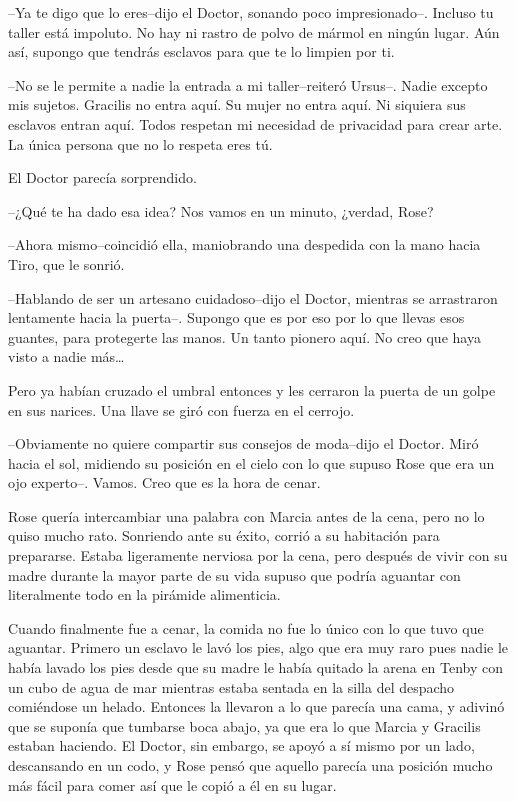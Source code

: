 --Ya te digo que lo eres--dijo el Doctor, sonando poco impresionado--.
Incluso tu taller está impoluto. No hay ni rastro de polvo de mármol en
ningún lugar. Aún así, supongo que tendrás esclavos para que te lo
limpien por ti.

--No se le permite a nadie la entrada a mi taller--reiteró Ursus--.
Nadie excepto mis sujetos. Gracilis no entra aquí. Su mujer no entra
aquí. Ni siquiera sus esclavos entran aquí. Todos respetan mi necesidad
de privacidad para crear arte. La única persona que no lo respeta eres
tú.

El Doctor parecía sorprendido.

--¿Qué te ha dado esa idea? Nos vamos en un minuto, ¿verdad, Rose?

--Ahora mismo--coincidió ella, maniobrando una despedida con la mano
hacia Tiro, que le sonrió.

--Hablando de ser un artesano cuidadoso--dijo el Doctor, mientras se
arrastraron lentamente hacia la puerta--. Supongo que es por eso por lo
que llevas esos guantes, para protegerte las manos. Un tanto pionero
aquí. No creo que haya visto a nadie más\ldots{}

Pero ya habían cruzado el umbral entonces y les cerraron la puerta de un
golpe en sus narices. Una llave se giró con fuerza en el cerrojo.

--Obviamente no quiere compartir sus consejos de moda--dijo el Doctor.
Miró hacia el sol, midiendo su posición en el cielo con lo que supuso
Rose que era un ojo experto--. Vamos. Creo que es la hora de cenar.

Rose quería intercambiar una palabra con Marcia antes de la cena, pero
no lo quiso mucho rato. Sonriendo ante su éxito, corrió a su habitación
para prepararse. Estaba ligeramente nerviosa por la cena, pero después
de vivir con su madre durante la mayor parte de su vida supuso que
podría aguantar con literalmente todo en la pirámide alimenticia.

Cuando finalmente fue a cenar, la comida no fue lo único con lo que tuvo
que aguantar. Primero un esclavo le lavó los pies, algo que era muy raro
pues nadie le había lavado los pies desde que su madre le había quitado
la arena en Tenby con un cubo de agua de mar mientras estaba sentada en
la silla del despacho comiéndose un helado. Entonces la llevaron a lo
que parecía una cama, y adivinó que se suponía que tumbarse boca abajo,
ya que era lo que Marcia y Gracilis estaban haciendo. El Doctor, sin
embargo, se apoyó a sí mismo por un lado, descansando en un codo, y Rose
pensó que aquello parecía una posición mucho más fácil para comer así
que le copió a él en su lugar.

